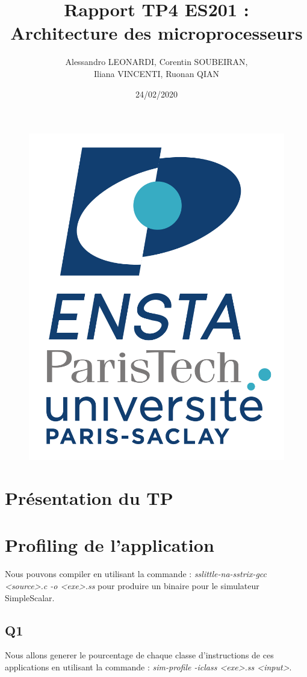 \documentclass[a4paper]{article}
\title{\textbf{Rapport TP4 ES201 : \\ Architecture des microprocesseurs} \vspace{0.7cm}}
\date{24/02/2020}
\author{Alessandro LEONARDI, Corentin SOUBEIRAN,  \\ Iliana VINCENTI, Ruonan QIAN}
\theoremstyle{plain}
\begin{document}
   
    \begin{figure}
		\centering
		\includegraphics[width=0.5\linewidth]{logo_ENSTA}
	\end{figure} 
   
	\maketitle
	
	\thispagestyle{empty}
	\newpage
	\setcounter{page}{1}
	\tableofcontents
	\newpage


	\section{Présentation du TP}
	
    \newpage
	\section{Profiling de l’application}
		Nous pouvons compiler en utilisant la commande : \textit{sslittle-na-sstrix-gcc <source>.c -o <exe>.ss} pour produire un binaire pour le simulateur SimpleScalar.
		\subsection{Q1}
			Nous allons generer le pourcentage de chaque classe d'instructions de ces applications en utilisant la commande : \textit{sim-profile -iclass <exe>.ss <input>}.
\end{document}

